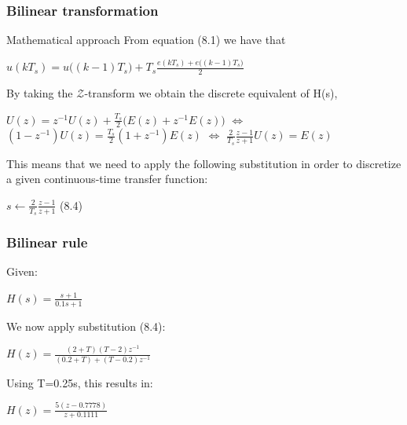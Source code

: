 \begin{frame}
	\frametitle{Bilinear transformation}
	\begin{block}{Mathematical approach}
		From equation (8.1) we have that
		\vspace{-1em}
		\begin{center}
			$u(kT_s) = u\big((k-1)T_s \big) + T_s \frac{e(kT_s) + e \big((k-1)T_s\big)}{2}$\\
		\end{center}
		By taking the $\mathcal{Z}$-transform we obtain the discrete equivalent of H(s),
		\vspace{-1em}
		\begin{center}
			$U(z) = z^{-1}U(z) + \frac{T_s}{2} \big( E(z) + z^{-1}E(z) \big)$ \hspace{0.5em} $\Leftrightarrow$ \hspace{0.5em} \
			\ $(1 - z^{-1})U(z) = \frac{T_s}{2} (1 + z^{-1}) E(z)$ \hspace{0.5em} $\Leftrightarrow$ \hspace{0.5em} $\frac{2}{T_s}\frac{z-1}{z+1}U(z) = E(z)$
		\end{center}
		This means that we need to apply the following substitution in order to discretize a given continuous-time transfer function:
		\begin{center}
			$s \gets \frac{2}{T_s}\frac{z-1}{z+1}$ (8.4)
		\end{center}
	\end{block}
\end{frame}

\begin{frame}
	\frametitle{Bilinear rule}
	\begin{example}
		Given:
		\begin{center}
			$H(s) = \frac{s + 1}{0.1s + 1}$
		\end{center}
		We now apply substitution (8.4):
		\begin{center}
			$H(z) = \frac{(2 + T)(T - 2)z^{-1}}{(0.2 + T) + (T - 0.2)z^{-1}}$
		\end{center}
		Using T=0.25s, this results in:
		\begin{center}
			$H(z) = \frac{5(z - 0.7778)}{z + 0.1111}$
		\end{center}
	\end{example}
\end{frame}

